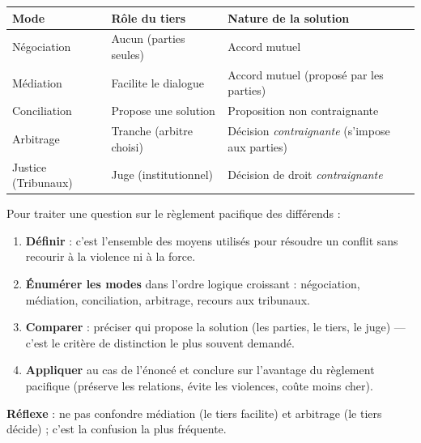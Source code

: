 \documentclass[11pt]{article}
\newcommand{\cle}[1]{{\popxbold\color{popdark}#1}}
\begin{document}
\begin{aretenir}
\begin{center}
\begin{tabularx}{\linewidth}{|l|X|X|}\hline
\textbf{Mode} & \textbf{Rôle du tiers} & \textbf{Nature de la solution} \\ \hline
\cle{Négociation} & Aucun (parties seules) & Accord mutuel \\ \hline
\cle{Médiation} & Facilite le dialogue & Accord mutuel (proposé par les parties) \\ \hline
\cle{Conciliation} & Propose une solution & Proposition non contraignante \\ \hline
\cle{Arbitrage} & Tranche (arbitre choisi) & Décision \emph{contraignante} (s'impose aux parties) \\ \hline
\cle{Justice (Tribunaux)} & Juge (institutionnel) & Décision de droit \emph{contraignante} \\ \hline
\end{tabularx}
\end{center}
\end{aretenir}

\begin{methode}
Pour traiter une question sur le \cle{règlement pacifique des différends} :
\begin{enumerate}
\item \textbf{Définir} : c'est l'ensemble des moyens utilisés pour résoudre un conflit sans recourir à la violence ni à la force.
\item \textbf{Énumérer les modes} dans l'ordre logique croissant : négociation, médiation, conciliation, arbitrage, recours aux tribunaux.
\item \textbf{Comparer} : préciser qui propose la solution (les parties, le tiers, le juge) — c'est le critère de distinction le plus souvent demandé.
\item \textbf{Appliquer} au cas de l'énoncé et conclure sur l'avantage du règlement pacifique (préserve les relations, évite les violences, coûte moins cher).
\end{enumerate}
\textbf{Réflexe} : ne pas confondre médiation (le tiers facilite) et arbitrage (le tiers décide) ; c'est la confusion la plus fréquente.
\end{methode}
\end{document}
